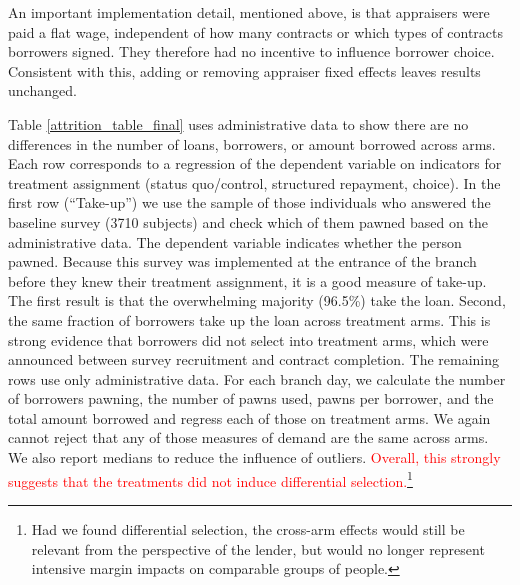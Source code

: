 \documentclass[12pt, a4paper, colorinlistoftodos]{article}
\begin{document}
An important implementation detail, mentioned above, is that appraisers were paid a flat wage, independent of how many contracts or which types of contracts borrowers signed. They therefore had no incentive to influence borrower choice. Consistent with this, adding or removing appraiser fixed effects leaves results unchanged. 

Table \ref{attrition_table_final} uses administrative data to show there are no differences in the number of loans, borrowers, or amount borrowed across arms. Each row corresponds to a regression of the dependent variable on indicators for treatment assignment (status quo/control, structured repayment, choice). In the first row (``Take-up'') we use the sample of those individuals who answered the baseline survey (3710 subjects) and check which of them pawned based on the administrative data. The dependent variable indicates whether the person pawned. Because this survey was implemented at the entrance of the branch before they knew their treatment assignment, it is a good measure of take-up. The first result is that the overwhelming majority (96.5\%) take the loan. Second, the same fraction of borrowers take up the loan across treatment arms. This is strong evidence that borrowers did not select into treatment arms, which were announced between survey recruitment and contract completion. The remaining rows use only administrative data. For each branch day, we calculate the number of borrowers pawning, the number of pawns used, pawns per borrower, and the total amount borrowed and regress each of those on treatment arms. We again cannot reject that any of those measures of demand are the same across arms.  We also report medians to reduce the influence of outliers. \textcolor{red}{Overall, this strongly suggests that the treatments did not induce differential selection.}\footnote{Had we found differential selection, the cross-arm effects would still be relevant from the perspective of the lender, but would no longer represent intensive margin impacts on comparable groups of people.}

\end{document}
